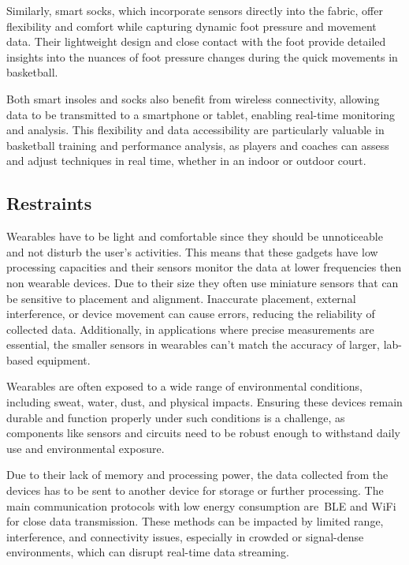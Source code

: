 Similarly, smart socks, which incorporate sensors directly into the fabric, offer flexibility and comfort while capturing dynamic foot pressure and movement data. Their lightweight 
design and close contact with the foot provide detailed insights into the nuances of foot pressure changes during the quick movements in basketball.

Both smart insoles and socks also benefit from wireless connectivity, allowing data to be transmitted to a smartphone or tablet, enabling real-time monitoring and analysis. This 
flexibility and data accessibility are particularly valuable in basketball training and performance analysis, as players and coaches can assess and adjust techniques in real time, 
whether in an indoor or outdoor court.

\subsection{Restraints}
\label{ssec:restraints}

Wearables have to be light and comfortable since they should be unnoticeable and not disturb the user's activities. This means that these gadgets have low processing capacities 
and their sensors monitor the data at lower frequencies then non wearable devices. Due to their size they often use miniature sensors that can be sensitive to placement and alignment. 
Inaccurate placement, external interference, or device movement can cause errors, reducing the reliability of collected data. Additionally, in applications where precise measurements 
are essential, the smaller sensors in wearables can't match the accuracy of larger, lab-based equipment.

Wearables are often exposed to a wide range of environmental conditions, including sweat, water, dust, and physical impacts. Ensuring these devices remain durable and function properly 
under such conditions is a challenge, as components like sensors and circuits need to be robust enough to withstand daily use and environmental exposure.

Due to their lack of memory and processing power, the data collected from the devices has to be sent to another device for storage or further processing. The main communication protocols 
with low energy consumption are~\gls{BLE} and WiFi for close data transmission. These methods can be impacted by limited range, interference, and connectivity issues, 
especially in crowded or signal-dense environments, which can disrupt real-time data streaming.


